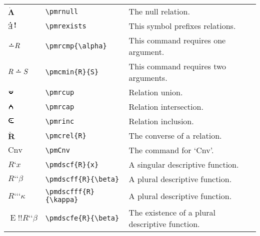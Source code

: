 \documentclass[12pt]{article}
\newcommand{\pmbreve}[1]{\boldsymbol{\breve{\text{$#1$}}}}
\newcommand{\pmcirc}[1]{\boldsymbol{\dot{\text{$#1$}}}}
\newcommand{\pmshr}{\textbf{!}} %
\newcommand{\pmcinc}{\mathop{\ooalign{$\boldsymbol{\subset}$\cr\hidewidth$\hspace{.1em}\boldsymbol{\subset}$\cr\hidewidth$\hspace{.15em}\boldsymbol{\subset}$\cr\hidewidth$\hspace{.2em}\boldsymbol{\subset}$}}} %
\newcommand{\pmccap}{\mathop{\ooalign{\scalebox{1.3}[1.75]{$\put(3, 2){\oval(4,1)[t]}\phantom{\circ}$}\cr\hidewidth\hspace{.1em}\scalebox{1.3}[1.75]{$\put(3, 2){\oval(4,1)[t]}\phantom{\circ}$}\cr\hidewidth\hspace{.2em}\scalebox{1.3}[1.75]{$\put(3, 2){\oval(4,1)[t]}\phantom{\circ}$}\cr\hidewidth\hspace{.3em}\scalebox{1.3}[1.75]{$\put(3, 2){\oval(4,1)[t]}\phantom{\circ}$}\cr\hidewidth\hspace{.4em}\scalebox{1.3}[1.75]{$\put(3, 2){\oval(4,1)[t]}\phantom{\circ}$}\cr\hidewidth\hspace{.5em}\scalebox{1.3}[1.75]{$\put(3, 2){\oval(4,1)[t]}\phantom{\circ}$}\cr\hidewidth\hspace{.6em}\scalebox{1.3}[1.75]{$\put(3, 2){\oval(4,1)[t]}\phantom{\circ}$}}}} %
\newcommand{\pmccup}{\mathop{\ooalign{\scalebox{1.3}[1.75]{$\put(3, 2.5){\oval(4,4)[b]}\phantom{\circ}$}\cr\hidewidth\hspace{.1em}\scalebox{1.3}[1.75]{$\put(3, 2.5){\oval(4,4)[b]}\phantom{\circ}$}\cr\hidewidth\hspace{.2em}\scalebox{1.3}[1.75]{$\put(3, 2.5){\oval(4,4)[b]}\phantom{\circ}$}\cr\hidewidth\hspace{.3em}\scalebox{1.3}[1.75]{$\put(3, 2.5){\oval(4,4)[b]}\phantom{\circ}$}\cr\hidewidth\hspace{.4em}\scalebox{1.3}[1.75]{$\put(3, 2.5){\oval(4,4)[b]}\phantom{\circ}$}\cr\hidewidth\hspace{.5em}\scalebox{1.3}[1.75]{$\put(3, 2.5){\oval(4,4)[b]}\phantom{\circ}$}\cr\hidewidth\hspace{.6em}\scalebox{1.3}[1.75]{$\put(3, 2.5){\oval(4,4)[b]}\phantom{\circ}$}}}} %
\newcommand{\pmccmp}[1]{\boldsymbol{-}#1} %
\newcommand{\pmcmin}[2]{#1\boldsymbol{-}#2} %
\newcommand{\pmrcmp}[1]{\ooalign{$\hidewidth\raisebox{.25em}{$\boldsymbol{\cdot}$}\hidewidth$\cr$\boldsymbol{\pmccmp}$}#1} %
\newcommand{\pmrmin}[2]{#1\mathrel{\ooalign{$\hidewidth\raisebox{.25em}{$\boldsymbol{\cdot}$}\hidewidth$\cr$\boldsymbol{\pmccmp}$}}#2} %
\newcommand{\pmrnull}{\pmcirc{\Lambda}} %
\newcommand{\pmrexists}{\pmcirc{\mathop{\text{\raisebox{.5em}{\rotatebox{180}{E}}}}}\mathop{\pmshr}} %
\newcommand{\pmrinc}{\mathrel{\ooalign{$\hidewidth\boldsymbol{\cdot}\hidewidth$\cr$\boldsymbol{\pmcinc}$}}} %
\newcommand{\pmrcap}{\mathrel{\ooalign{$\hidewidth\raisebox{.3em}{$\boldsymbol{\cdot}$}\hidewidth$\cr$\boldsymbol{\pmccap}$}}} %
\newcommand{\pmrcup}{\mathrel{\ooalign{$\hidewidth\raisebox{.1em}{$\boldsymbol{\cdot}$}\hidewidth$\cr$\boldsymbol{\pmccup}$}}} %
\newcommand{\pmdscf}[2]{#1\textbf{`}#2} %
\newcommand{\pmCnv}{\text{Cnv}}
\newcommand{\pmcrel}[1]{\pmbreve{#1}} %
\newcommand{\pmdscff}[2]{#1\textbf{`}\textbf{`}#2} %
\newcommand{\pmdscfff}[2]{#1\textbf{`}\textbf{`}\textbf{`}#2} %
\newcommand{\pmdscfe}[2]{\mathop{\text{E}}\mathop{\pmshr\pmshr}\pmdscff{#1}{#2}} %
\begin{document}
\begin{tabular}{@{}p{3cm} | p{5cm} | p{8.25cm}}
	$\pmrnull$ & \verb|\pmrnull| & The null relation. \\
	$\pmrexists$ & \verb|\pmrexists| & This symbol prefixes relations. \\
	$\pmrcmp{R}$ & \verb|\pmrcmp{\alpha}| & This command requires one argument. \\
	$\pmrmin{R}{S}$ & \verb|\pmcmin{R}{S}| & This command requires two arguments. \\
	$\pmrcup$ & \verb|\pmrcup| & Relation union. \\
	$\pmrcap$ & \verb|\pmrcap| & Relation intersection. \\
	$\pmrinc$ & \verb|\pmrinc| & Relation inclusion. \\
	$\pmcrel{R}$ & \verb|\pmcrel{R}| & The converse of a relation. \\
	$\pmCnv$ & \verb|\pmCnv| & The command for `Cnv'. \\
	$\pmdscf{R}{x}$ & \verb|\pmdscf{R}{x}| & A singular descriptive function. \\
	$\pmdscff{R}{\beta}$ & \verb|\pmdscff{R}{\beta}| & A plural descriptive function. \\
	$\pmdscfff{R}{\kappa}$ & \verb|\pmdscfff{R}{\kappa}| & A plural descriptive function.   \\
	$\pmdscfe{R}{\beta}$ & \verb|\pmdscfe{R}{\beta}| & The existence of a plural descriptive function.
\end{tabular}
\end{document}
